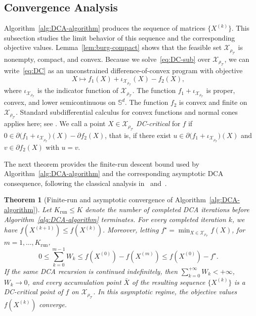 \documentclass[11pt, letterpaper, oneside, reqno]{amsart}
\newcommand{\opt}{^\star}
\newtheorem{theorem}{Theorem}
\begin{document}
\subsection{Convergence Analysis}\label{sec:solution-convergence}
Algorithm~\ref{alg:DCA-algorithm} produces the sequence of matrices $\{X^{(k)}\}$. This subsection studies the limit behavior of this sequence and the corresponding objective values. Lemma~\ref{lem:burg-compact} shows that the feasible set $\mathcal X_{\rho_{\mathcal T}}$ is nonempty, compact, and convex. Because we solve~\eqref{eq:DC-sub} over $\mathcal X_{\rho_{\mathcal T}}$, we can write~\eqref{eq:DC} as an unconstrained difference-of-convex program with objective
\[
X \mapsto f_1(X) + \iota_{\mathcal X_{\rho_{\mathcal T}}}(X) - f_2(X),
\]
where $\iota_{\mathcal X_{\rho_{\mathcal T}}}$ is the indicator function of $\mathcal X_{\rho_{\mathcal T}}$. The function $f_1 + \iota_{\mathcal X_{\rho_{\mathcal T}}}$ is proper, convex, and lower semicontinuous on $\mathbb S^d$. The function $f_2$ is convex and finite on $\mathcal X_{\rho_{\mathcal T}}$. Standard subdifferential calculus for convex functions and normal cones applies here; see \cite[Section~1]{ref:le2014dc}.
We call a point $X \in \mathcal X_{\rho_{\mathcal T}}$ \textit{DC-critical} for $f$ if $0 \in \partial\bigl(f_1 + \iota_{\mathcal X_{\rho_{\mathcal T}}}\bigr)(X) - \partial f_2(X)$, that is, if there exist $u \in \partial\bigl(f_1 + \iota_{\mathcal X_{\rho_{\mathcal T}}}\bigr)(X)$ and $v \in \partial f_2(X)$ with $u = v$. 

The next theorem provides the finite-run descent bound used by Algorithm~\ref{alg:DCA-algorithm} and the corresponding asymptotic DCA consequence, following the classical analysis in~\cite[Theorem~3(iv)]{ref:tao1997convex} and~\cite[Section~1]{ref:le2014dc}.

\begin{theorem}[Finite-run and asymptotic convergence of Algorithm~\ref{alg:DCA-algorithm}]
\label{thm:convergence-of-DCA}
Let $K_{\mathrm{run}}\le K$ denote the number of completed DCA iterations before Algorithm~\ref{alg:DCA-algorithm} terminates. For every completed iteration $k$, we have $f(X^{(k+1)})\le f(X^{(k)})$.
Moreover, letting $f\opt = \min_{X\in\mathcal X_{\rho_{\mathcal T}}} f(X)$, for $m=1,\ldots,K_{\mathrm{run}}$,
\[
0\le \sum_{k=0}^{m-1}W_k
\le f(X^{(0)})-f(X^{(m)})
\le f(X^{(0)})-f\opt.
\]
If the same DCA recursion is continued indefinitely, then $\sum_{k=0}^{+\infty}W_k<+\infty$, $W_k\to0$, and every accumulation point $\bar X$ of the resulting sequence $\{X^{(k)}\}$ is a DC-critical point of $f$ on $\mathcal X_{\rho_{\mathcal T}}$. In this asymptotic regime, the objective values $f(X^{(k)})$ converge.
\end{theorem}
\end{document}
